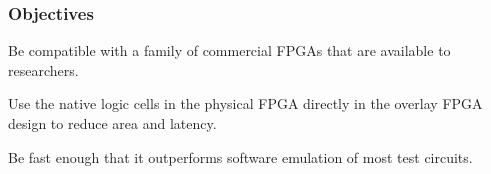 \subsubsection{Objectives}

\begin{itemlist}
	\item Be compatible with a family of commercial FPGAs that are available to researchers.
	\item Use the native logic cells in the physical FPGA directly in the overlay FPGA design to reduce area and latency.
	\item Be fast enough that it outperforms software emulation of most test circuits.
\end{itemlist}

